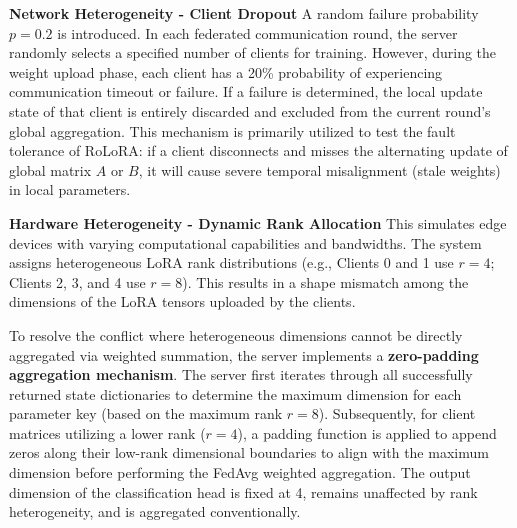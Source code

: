 \documentclass[journal]{IEEEtran}
\begin{document}
\textbf{Network Heterogeneity - Client Dropout}
A random failure probability $p = 0.2$ is introduced. In each federated communication round, the server randomly selects a specified number of clients for training. However, during the weight upload phase, each client has a 20\% probability of experiencing communication timeout or failure. If a failure is determined, the local update state of that client is entirely discarded and excluded from the current round's global aggregation. This mechanism is primarily utilized to test the fault tolerance of RoLoRA: if a client disconnects and misses the alternating update of global matrix $A$ or $B$, it will cause severe temporal misalignment (stale weights) in local parameters. \cite{xie2019asynchronous}

\textbf{Hardware Heterogeneity - Dynamic Rank Allocation}
This simulates edge devices with varying computational capabilities and bandwidths. The system assigns heterogeneous LoRA rank distributions (e.g., Clients 0 and 1 use $r=4$; Clients 2, 3, and 4 use $r=8$). This results in a shape mismatch among the dimensions of the LoRA tensors uploaded by the clients.

To resolve the conflict where heterogeneous dimensions cannot be directly aggregated via weighted summation, the server implements a \textbf{zero-padding aggregation mechanism}. The server first iterates through all successfully returned state dictionaries to determine the maximum dimension for each parameter key (based on the maximum rank $r=8$). Subsequently, for client matrices utilizing a lower rank ($r=4$), a padding function is applied to append zeros along their low-rank dimensional boundaries to align with the maximum dimension before performing the FedAvg weighted aggregation. The output dimension of the classification head is fixed at 4, remains unaffected by rank heterogeneity, and is aggregated conventionally.
\end{document}
